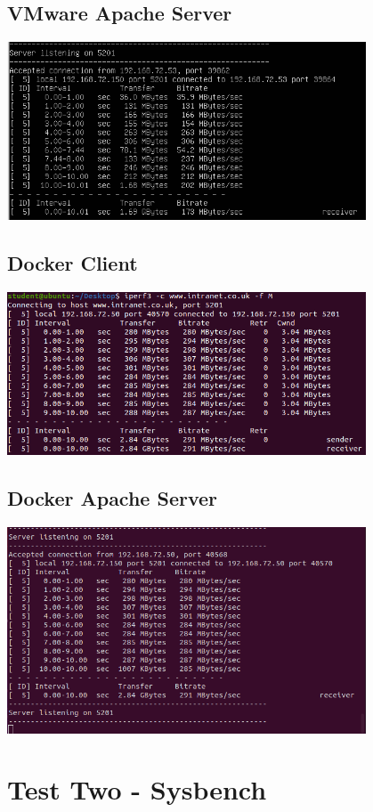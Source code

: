 \documentclass[12pt,twoside]{book}
\begin{document}
\subsection{VMware Apache Server}
\includegraphics[width=0.80\textwidth]{Appendicies/VMwareTest1Apache.PNG}
\subsection{Docker Client}
\includegraphics[width=0.80\textwidth]{Appendicies/DockerTest1Client.PNG}
\subsection{Docker Apache Server}
\includegraphics[width=0.80\textwidth]{Appendicies/DockerTest1Apache.PNG}
\section{Test Two - Sysbench}
\end{document}
